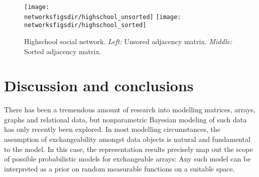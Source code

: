 \begin{figure}[ht]
  \centering
  \texttt{[image: \\networksfigsdir/highschool\_unsorted]}
  \texttt{[image: \\networksfigsdir/highschool\_sorted]}
  \caption{Highschool social network. 
    \emph{Left:} Unsored adjacency matrix. 
    \emph{Middle:} Sorted adjacency matrix.
  }
  \label{fig:networks:highschool}
\end{figure}


\section{Discussion and conclusions}

There has been a tremendous amount of research into modelling matrices, arrays, graphs and relational data, but nonparametric
Bayesian modeling of such data has only recently been explored.
In most modelling circumstances, the assumption of exchangeability amongst data objects is natural and fundamental to the model.
In this case, the representation results 
\citep{Aldous1981-lg,Hoover1979-br,Kallenberg1992-gb} 
precisely map out the scope of possible probabilistic models for exchangeable arrays:
Any such model can be interpreted as a prior on random measurable functions on a suitable space.


